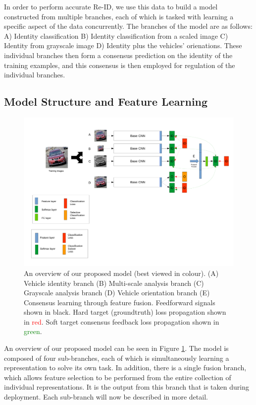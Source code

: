 \documentclass[10pt,twocolumn,letterpaper]{article}
\begin{document}
In order to perform accurate Re-ID, we use this data to build a model constructed from multiple branches, each of which is tasked with learning a specific aspect of the data concurrently. The branches of the model are as follows: A) Identity classification B) Identity classification from a scaled image C) Identity from grayscale image D) Identity plus the vehicles' orienations.
These individual branches then form a consensus prediction on the identity of the training examples, and this consensus is then employed for regulation of the individual branches.

\subsection{Model Structure and Feature Learning}

\begin{figure}
  \includegraphics[width=\linewidth,trim=0cm 8cm 0cm 0cm,clip=true]{images/system_overview_orient_only.pdf}
  \caption{An overview of our proposed model (best viewed in colour). (A) Vehicle identity branch (B) Multi-scale analysis branch (C) Grayscale analysis branch (D) Vehicle orientation branch
(E) Consensus learning through feature fusion. Feedforward signals shown in black. Hard target (groundtruth) loss propagation shown in \textcolor{red}{red}. Soft target consensus feedback loss propagation shown in \textcolor{green}{green}.}
  \label{F:overview}
\end{figure}

An overview of our proposed model can be seen in Figure
\ref{F:overview}. The model is composed of four sub-branches, each of
which is simultaneously learning a representation to solve its own
task. In addition, there is a single fusion branch, which allows
feature selection to be performed from the entire collection of
individual representations. It is the output from this branch that is
taken during deployment. Each sub-branch will now be described in more
detail.
\end{document}
